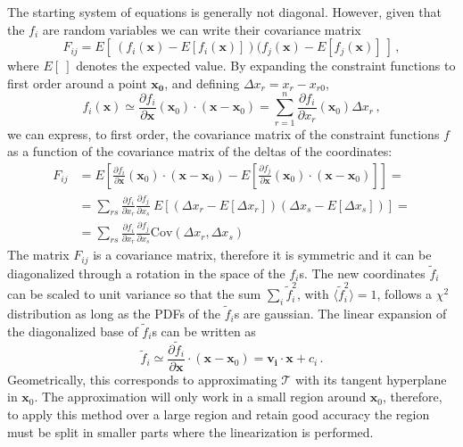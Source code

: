 \documentclass[10pt,a4paper]{report}
\newcommand{\bfx}{\mathbf{x}}
\begin{document}
The starting system of equations is generally not diagonal. However, given that the ${f_i}$ are random variables we can write their covariance matrix
\begin{equation}
F_{ij} = E[\ (f_i(\bfx) - E[f_i(\bfx)])(f_j(\bfx) - E[f_j(\bfx)]\ ]\, ,
\end{equation}
where $E[\ ]$ denotes the expected value. By expanding the constraint functions to first order around a point $\mathbf{x_0}$, and defining $\Delta x_r = x_r - x_{r0}$,
\begin{equation}
f_i(\bfx) \simeq \frac{\partial f_i}{\partial \bfx}(\bfx_0)\cdot (\bfx - \bfx_0) = \sum\limits_{r=1}^n \frac{\partial f_i}{\partial x_r}(\bfx_0)\Delta x_r\, ,
\end{equation}
we can express, to first order, the covariance matrix of the constraint functions {$f$} as a function of the covariance matrix of the deltas of the coordinates:
\begin{equation}
\begin{aligned}
F_{ij} &= E\left[\frac{\partial f_i}{\partial \bfx}(\bfx_0)\cdot (\bfx - \bfx_0) - E\left[\frac{\partial f_j}{\partial \bfx}(\bfx_0)\cdot (\bfx - \bfx_0) \right] \right] = \\
       &= \sum\limits_{rs}\frac{\partial f_i}{\partial x_r}\frac{\partial f_j}{\partial x_s} \ E\left[(\Delta x_r - E[\Delta x_r])(\Delta x_s - E[\Delta x_s])\right] = \\
       &= \sum\limits_{rs}\frac{\partial f_i}{\partial x_r}\frac{\partial f_j}{\partial x_s} \mbox{Cov}(\Delta x_r, \Delta x_s)
\end{aligned}
\end{equation}
The matrix $F_{ij}$ is a covariance matrix, therefore it is symmetric and it can be diagonalized through a rotation in the space of the $f_i$s. The new coordinates $\tilde{f}_i$ can be scaled to unit variance so that the sum $\sum_i \tilde{f}^2_i$, with $\langle\tilde{f}^2_i\rangle = 1$, follows a $\chi^2$ distribution as long as the PDFs of the $\tilde{f}_i$s are gaussian. The linear expansion of the diagonalized base of $\tilde{f}_i$s can be written as
\begin{equation}
\tilde{f}_i \simeq \frac{\partial \tilde{f}_i}{\partial \bfx}\cdot(\bfx - \bfx_0) = \mathbf{v_i} \cdot \bfx + c_i \, .
\label{eq:vis}
\end{equation}
Geometrically, this corresponds to approximating $\mathcal{T}$ with its tangent hyperplane in $\bfx_0$. The approximation will only work in a small region around $\bfx_0$, therefore, to apply this method over a large region and retain good accuracy the region must be split in smaller parts where the linearization is performed.
\end{document}
